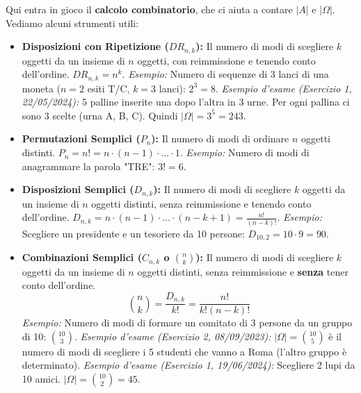 Qui entra in gioco il \textbf{calcolo combinatorio}, che ci aiuta a contare $|A|$ e $|\Omega|$.
Vediamo alcuni strumenti utili:

\begin{itemize}
    \item \textbf{Disposizioni con Ripetizione ($DR_{n,k}$):} Il numero di modi di scegliere $k$ oggetti da un insieme di $n$ oggetti, con reimmissione e tenendo conto dell'ordine. $DR_{n,k} = n^k$.
    \textit{Esempio:} Numero di sequenze di 3 lanci di una moneta ($n=2$ esiti T/C, $k=3$ lanci): $2^3=8$.
    \textit{Esempio d'esame (Esercizio 1, 22/05/2024):} 5 palline inserite una dopo l'altra in 3 urne. Per ogni pallina ci sono 3 scelte (urna A, B, C). Quindi $|\Omega| = 3^5 = 243$.

    \item \textbf{Permutazioni Semplici ($P_n$):} Il numero di modi di ordinare $n$ oggetti distinti. $P_n = n! = n \cdot (n-1) \cdot \dots \cdot 1$.
    \textit{Esempio:} Numero di modi di anagrammare la parola "TRE": $3! = 6$.

    \item \textbf{Disposizioni Semplici ($D_{n,k}$):} Il numero di modi di scegliere $k$ oggetti da un insieme di $n$ oggetti distinti, senza reimmissione e tenendo conto dell'ordine. $D_{n,k} = n \cdot (n-1) \cdot \dots \cdot (n-k+1) = \frac{n!}{(n-k)!}$.
    \textit{Esempio:} Scegliere un presidente e un tesoriere da 10 persone: $D_{10,2} = 10 \cdot 9 = 90$.

    \item \textbf{Combinazioni Semplici ($C_{n,k}$ o $\binom{n}{k}$):} Il numero di modi di scegliere $k$ oggetti da un insieme di $n$ oggetti distinti, senza reimmissione e \textbf{senza} tener conto dell'ordine.
    \[ \binom{n}{k} = \frac{D_{n,k}}{k!} = \frac{n!}{k!(n-k)!} \]
    \textit{Esempio:} Numero di modi di formare un comitato di 3 persone da un gruppo di 10: $\binom{10}{3}$.
    \textit{Esempio d'esame (Esercizio 2, 08/09/2023):} $|\Omega| = \binom{10}{5}$ è il numero di modi di scegliere i 5 studenti che vanno a Roma (l'altro gruppo è determinato).
    \textit{Esempio d'esame (Esercizio 1, 19/06/2024):} Scegliere 2 lupi da 10 amici. $|\Omega| = \binom{10}{2} = 45$.
\end{itemize}

